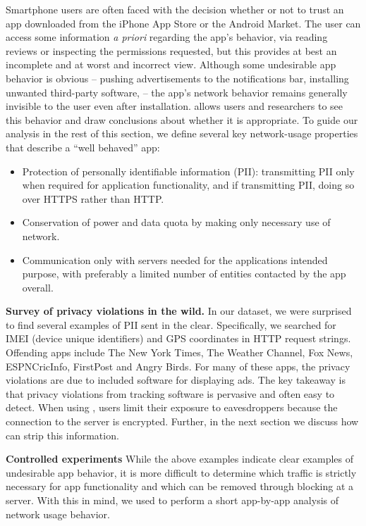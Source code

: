 
    Smartphone users are often faced with the decision whether or not to trust an app downloaded from the iPhone App Store or the Android Market.
    The user can access some information \emph{a priori} regarding the app's behavior, \eg{} via reading reviews or inspecting the permissions requested, but this provides at best an incomplete and at worst and incorrect view.
    Although some undesirable app behavior is obvious -- \eg{} pushing advertisements to the notifications bar, installing unwanted third-party software, \etc{} -- the app's network behavior remains generally invisible to the user even after installation. \meddle allows users and researchers to see this behavior and draw conclusions about whether it is appropriate. 
     To guide our analysis in the rest of this section, we define several key network-usage properties that describe a ``well behaved'' app:
    \begin{itemize}
        \item Protection of personally identifiable information (PII): transmitting PII only when required for application functionality, and if transmitting PII, doing so over HTTPS rather than HTTP.
        \item Conservation of power and data quota by making only necessary use of network.
        \item Communication only with servers needed for the applications intended purpose, with preferably a limited number of entities contacted by the app overall.
    \end{itemize}

\noindent\textbf{Survey of privacy violations in the wild.} In our dataset, we were surprised to find several examples of PII sent in the clear. Specifically, we searched for IMEI (device unique identifiers) and 
GPS coordinates in HTTP request strings. Offending apps include The New York Times, The Weather Channel, Fox News, ESPNCricInfo, FirstPost and 
Angry Birds. For many of these apps, the privacy violations are due to included software for displaying ads. The key takeaway is that privacy 
violations from tracking software is pervasive and often easy to detect. When using \meddle, users limit their exposure to eavesdroppers 
because the connection to the \meddle server is encrypted. Further, in the next section we discuss how \meddle can strip this information. 
  
\noindent\textbf{Controlled experiments} While the above examples indicate clear examples of undesirable app behavior, 
it is more difficult to determine which traffic is strictly necessary for app functionality and which can be removed through blocking 
at a \meddle server. 
    With this in mind, we used \meddle to perform a short app-by-app analysis of network usage behavior.
    
